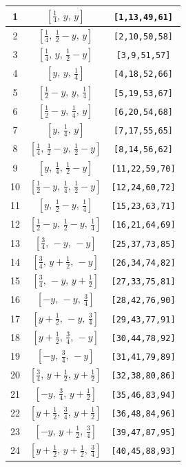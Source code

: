 \documentclass[fleqn,8pt]{jsarticle}
\begin{document}
\begin{longtable}{ccc}
1 & $\left[ \frac{1}{4},\, y,\, y \right]$ & {\tt [1,13,49,61]} \\ \hline
2 & $\left[ \frac{1}{4},\, \frac{1}{2} - y,\, y \right]$ & {\tt [2,10,50,58]} \\ \hline
3 & $\left[ \frac{1}{4},\, y,\, \frac{1}{2} - y \right]$ & {\tt [3,9,51,57]} \\ \hline
4 & $\left[ y,\, y,\, \frac{1}{4} \right]$ & {\tt [4,18,52,66]} \\ \hline
5 & $\left[ \frac{1}{2} - y,\, y,\, \frac{1}{4} \right]$ & {\tt [5,19,53,67]} \\ \hline
6 & $\left[ \frac{1}{2} - y,\, \frac{1}{4},\, y \right]$ & {\tt [6,20,54,68]} \\ \hline
7 & $\left[ y,\, \frac{1}{4},\, y \right]$ & {\tt [7,17,55,65]} \\ \hline
8 & $\left[ \frac{1}{4},\, \frac{1}{2} - y,\, \frac{1}{2} - y \right]$ & {\tt [8,14,56,62]} \\ \hline
9 & $\left[ y,\, \frac{1}{4},\, \frac{1}{2} - y \right]$ & {\tt [11,22,59,70]} \\ \hline
10 & $\left[ \frac{1}{2} - y,\, \frac{1}{4},\, \frac{1}{2} - y \right]$ & {\tt [12,24,60,72]} \\ \hline
11 & $\left[ y,\, \frac{1}{2} - y,\, \frac{1}{4} \right]$ & {\tt [15,23,63,71]} \\ \hline
12 & $\left[ \frac{1}{2} - y,\, \frac{1}{2} - y,\, \frac{1}{4} \right]$ & {\tt [16,21,64,69]} \\ \hline
13 & $\left[ \frac{3}{4},\, - y,\, - y \right]$ & {\tt [25,37,73,85]} \\ \hline
14 & $\left[ \frac{3}{4},\, y + \frac{1}{2},\, - y \right]$ & {\tt [26,34,74,82]} \\ \hline
15 & $\left[ \frac{3}{4},\, - y,\, y + \frac{1}{2} \right]$ & {\tt [27,33,75,81]} \\ \hline
16 & $\left[ - y,\, - y,\, \frac{3}{4} \right]$ & {\tt [28,42,76,90]} \\ \hline
17 & $\left[ y + \frac{1}{2},\, - y,\, \frac{3}{4} \right]$ & {\tt [29,43,77,91]} \\ \hline
18 & $\left[ y + \frac{1}{2},\, \frac{3}{4},\, - y \right]$ & {\tt [30,44,78,92]} \\ \hline
19 & $\left[ - y,\, \frac{3}{4},\, - y \right]$ & {\tt [31,41,79,89]} \\ \hline
20 & $\left[ \frac{3}{4},\, y + \frac{1}{2},\, y + \frac{1}{2} \right]$ & {\tt [32,38,80,86]} \\ \hline
21 & $\left[ - y,\, \frac{3}{4},\, y + \frac{1}{2} \right]$ & {\tt [35,46,83,94]} \\ \hline
22 & $\left[ y + \frac{1}{2},\, \frac{3}{4},\, y + \frac{1}{2} \right]$ & {\tt [36,48,84,96]} \\ \hline
23 & $\left[ - y,\, y + \frac{1}{2},\, \frac{3}{4} \right]$ & {\tt [39,47,87,95]} \\ \hline
24 & $\left[ y + \frac{1}{2},\, y + \frac{1}{2},\, \frac{3}{4} \right]$ & {\tt [40,45,88,93]} \\
\end{longtable}
\end{document}
